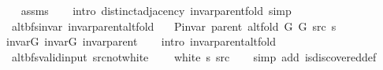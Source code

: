 \begin{isabellebody}
%
\isadeliminvisible
\isanewline
%
\endisadeliminvisible
%
\isadelimproof
\ \ %
\endisadelimproof
%
\isatagproof
{}\isamarkupfalse%
\ assms\isanewline
\ \ \isamarkupfalse%
\ {\isacharparenleft}{\kern0pt}intro\ distinct{\isacharunderscore}{\kern0pt}adjacency\ invar{\isacharunderscore}{\kern0pt}parent{\isacharunderscore}{\kern0pt}fold{\isacharparenright}{\kern0pt}\ simp%
\endisatagproof
{\isafoldproof}%
%
\isadelimproof
\isanewline
%
\endisadelimproof
\isanewline
{}\isamarkupfalse%
\ {\isacharparenleft}{\kern0pt}\ alt{\isacharunderscore}{\kern0pt}bfs{\isacharunderscore}{\kern0pt}invar{\isacharparenright}{\kern0pt}\ invar{\isacharunderscore}{\kern0pt}parent{\isacharunderscore}{\kern0pt}alt{\isacharunderscore}{\kern0pt}fold{\isacharcolon}{\kern0pt}\isanewline
\ \ \ {\isachardoublequoteopen}P{\isacharunderscore}{\kern0pt}invar\ {\isacharparenleft}{\kern0pt}parent\ {\isacharparenleft}{\kern0pt}alt{\isacharunderscore}{\kern0pt}fold\ G{}\ G{}\ src\ s{\isacharparenright}{\kern0pt}{\isacharparenright}{\kern0pt}{\isachardoublequoteclose}\isanewline
%
\isadelimproof
\ \ %
\endisadelimproof
%
\isatagproof
{}\isamarkupfalse%
\ invar{\isacharunderscore}{\kern0pt}G{}\ invar{\isacharunderscore}{\kern0pt}G{}\ invar{\isacharunderscore}{\kern0pt}parent\isanewline
\ \ \isamarkupfalse%
\ {\isacharparenleft}{\kern0pt}intro\ invar{\isacharunderscore}{\kern0pt}parent{\isacharunderscore}{\kern0pt}alt{\isacharunderscore}{\kern0pt}fold{\isacharparenright}{\kern0pt}%
\endisatagproof
{\isafoldproof}%
%
\isadelimproof
\isanewline
%
\endisadelimproof
%
\isadeliminvisible
\isanewline
%
\endisadeliminvisible
%
\isataginvisible
{}\isamarkupfalse%
\ {\isacharparenleft}{\kern0pt}\ alt{\isacharunderscore}{\kern0pt}bfs{\isacharunderscore}{\kern0pt}valid{\isacharunderscore}{\kern0pt}input{\isacharparenright}{\kern0pt}\ src{\isacharunderscore}{\kern0pt}not{\isacharunderscore}{\kern0pt}white{\isacharcolon}{\kern0pt}\isanewline
\ \ \ {\isachardoublequoteopen}{\isasymnot}\ white\ s\ src{\isachardoublequoteclose}%
\endisataginvisible
{\isafoldinvisible}%
%
\isadeliminvisible
\isanewline
%
\endisadeliminvisible
%
\isadelimproof
\ \ %
\endisadelimproof
%
\isatagproof
{}\isamarkupfalse%
\ {\isacharparenleft}{\kern0pt}simp\ add{\isacharcolon}{\kern0pt}\ is{\isacharunderscore}{\kern0pt}discovered{\isacharunderscore}{\kern0pt}def{\isacharparenright}{\kern0pt}%
\endisatagproof
{\isafoldproof}%

\end{isabellebody}
